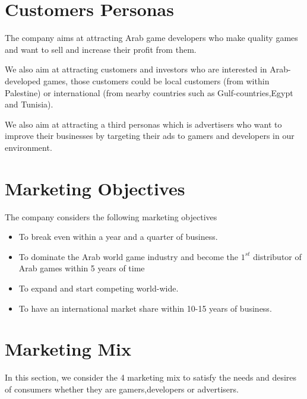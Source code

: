 \documentclass[fontsize=14pt,svgnames]{scrreprt}
\begin{document}
\section{Customers Personas}
The company aims at attracting Arab game developers who make quality games and want to sell and increase their profit from them.
\par We also aim at attracting customers and investors who are interested in Arab-developed games, those customers could be local customers (from within Palestine) or international (from nearby countries such as Gulf-countries,Egypt and Tunisia).
\par We also aim at attracting a third personas which is advertisers who want to improve their businesses by targeting their ads to gamers and developers in our environment.  
\section{Marketing Objectives}
The company considers the following marketing objectives
\begin{itemize}
\item  To break even within a year and a quarter of business.
\item To dominate the Arab world game industry and become the $1^{st}$ distributor of Arab games within 5 years of time
\item To expand and start competing world-wide.
\item To have an international market share within 10-15 years of business.
\end{itemize}
\section{Marketing Mix}
In this section, we consider the 4 marketing mix to satisfy the needs and desires of consumers whether they are gamers,developers or advertisers.
\end{document}
